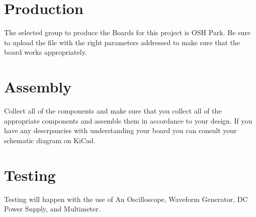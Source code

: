 \documentclass[12pt, letterpaper]{article}
\begin{document}
\section{Production}
The selected group to produce the Boards for this project is OSH Park. Be sure to upload the file with the right parameters addressed to make sure that the board works appropriately.

\section{Assembly}
Collect all of the components and make sure that you collect all of the appropriate components and assemble them in accordance to your design. If you have any descrpancies with understanding your board you can consult your schematic diagram on KiCad.

\section{Testing}
Testing will happen with the use of An Oscilloscope, Waveform Generator, DC Power Supply, and Multimeter.
\end{document}
